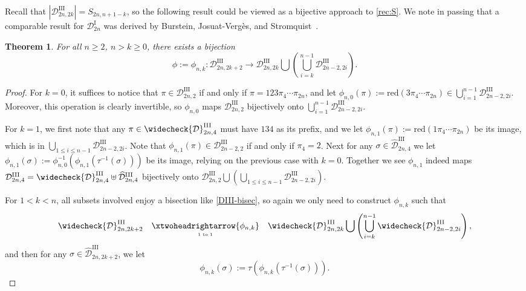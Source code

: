 \documentclass[11pt,reqno]{amsart}
\numberwithin{equation}{section}
\theoremstyle{plain}
\newtheorem{theorem}{Theorem}[section]
\theoremstyle{definition}
\newcommand{\D}{\mathcal{D}}
\newcommand{\DIII}{\D^{\mathrm{III}}}
\newcommand{\tD}{\widehat{\D}^{\mathrm{III}}}
\newcommand{\cD}{\widecheck{\D}^{\mathrm{III}}}
\def\re{\mathrm{red}}
\begin{document}
Recall that $|\DIII_{2n,2k}|=S_{2n,n+1-k}$, so the following result could be viewed as a bijective approach to \eqref{rec:S}. We note in passing that a comparable result for $\D^{\mathrm{I}}_{2n}$ was derived by Burstein, Josuat-Verg\`es, and Stromquist~\cite[Theorem~5.4]{BJS10}.

\begin{theorem}\label{DIII-even}
	For all $n\geq 2$, $n>k\geq0$, there exists a bijection
	$$\phi:=\phi_{n,k}: \DIII_{2n,2k+2} \to \DIII_{2n,2k}\bigcup\left(\bigcup_{i=k}^{n-1}\DIII_{2n-2,2i}\right).$$
\end{theorem}

\begin{proof}
	
	
	For $k=0$, it suffices to notice that $\pi \in \DIII_{2n,2}$ if and only if $\pi =123\pi_4 \cdots \pi_{2n}$, and let $\phi_{n,0}(\pi):=\re(3 \pi_4 \cdots \pi_{2n})\in \bigcup_{i=1}^{n-1}\DIII_{2n-2,2i}$. Moreover, this operation is clearly invertible, so $\phi_{n,0}$ maps $\DIII_{2n,2}$ bijectively onto $\bigcup_{i=1}^{n-1}\DIII_{2n-2,2i}$.
	
	For $k=1$, we first note that any $\pi \in \cD_{2n,4}$ must have $134$ as its prefix, and we let $\phi_{n,1}(\pi):=\re(1\pi_4\cdots\pi_{2n})$ be its image, which is in $\bigcup_{1\le i\le  n-1}\DIII_{2n-2,2i}$. Note that $\phi_{n,1}(\pi)\in\DIII_{2n-2,2}$ if and only if $\pi_4=2$. Next for any $\sigma\in\tD_{2n,4}$ we let $\phi_{n,1}(\sigma):=\phi_{n,0}^{-1}(\phi_{n,1}(\tau^{-1}(\sigma)))$ be its image, relying on the previous case with $k=0$. Together we see $\phi_{n,1}$ indeed maps $\DIII_{2n,4}=\cD_{2n,4}\uplus\tD_{2n,4}$ bijectively onto $\DIII_{2n,2}\bigcup\left(\bigcup_{1\le i\le n-1}\DIII_{2n-2,2i}\right)$.

	
	
	
	
	
	
	
	
	For $1<k<n$, all subsets involved enjoy a bisection like \eqref{DIII-bisec}, so again we only need to construct $\phi_{n,k}$ such that
	$$\cD_{2n,2k+2}\quad \underset{\text{\tiny 1 to 1}}{\xtwoheadrightarrow{\phi_{n,k}}} \quad \cD_{2n,2k}\bigcup\left(\bigcup_{i=k}^{n-1}\cD_{2n-2,2i}\right),$$
	and then for any $\sigma\in\tD_{2n,2k+2}$, we let 
	$$\phi_{n,k}(\sigma):=\tau(\phi_{n,k}(\tau^{-1}(\sigma))).$$


\end{proof}
\end{document}

